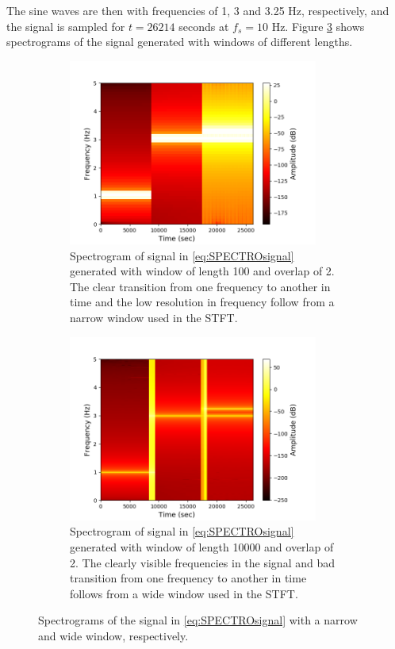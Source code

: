 The sine waves are then with frequencies of 1, 3 and 3.25 Hz, respectively, and the signal is sampled for $t=26214$ seconds at $f_s=10$ Hz. Figure \ref{fig:test_stft} shows spectrograms of the signal generated with windows of different lengths.
\begin{figure}[H]
\centering
\begin{subfigure}{0.49\textwidth}
\centering
\includegraphics[width=0.9\textwidth]{figures/validation/stft/1.png}
\caption{Spectrogram of signal in \eqref{eq:SPECTROsignal} generated with window of length 100 and overlap of 2. The clear transition from one frequency to another in time and the low resolution in frequency follow from a narrow window used in the STFT.}
\label{fig:test_stft1}
\end{subfigure}
\begin{subfigure}{0.49\textwidth}
\centering
\includegraphics[width=0.9\textwidth]{figures/validation/stft/2.png}
\caption{Spectrogram of signal in \eqref{eq:SPECTROsignal} generated with window of length 10000 and overlap of 2. The clearly visible frequencies in the signal and bad transition from one frequency to another in time follows from a wide window used in the STFT.}
\label{fig:test_stft2}
\end{subfigure}
\caption{Spectrograms of the signal in \eqref{eq:SPECTROsignal} with a narrow and wide window, respectively.}
\label{fig:test_stft}
\end{figure}
